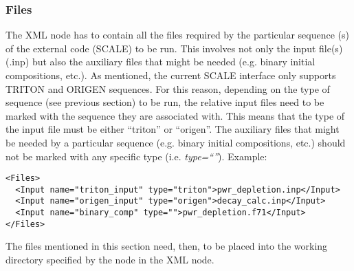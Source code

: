 \subsubsection{Files}
The  XML node has to contain all the files required by the particular
sequence (s) of the external code  (SCALE) to be run.
This involves not only the input file(s) (.inp) but also the auxiliary files that might be needed (e.g. binary initial compositions, etc.).
As mentioned, the current SCALE interface only supports TRITON and ORIGEN sequences. For this reason, depending on the
type of sequence (see previous section) to be run, the relative input files need to be marked with the sequence they are associated
with. This means that the type of the input file must be either ``triton'' or ``origen''. The auxiliary files that might be needed by
a particular sequence (e.g. binary initial compositions, etc.) should not be marked with any specific type (i.e. \textit{type=``''}).
Example:
\begin{lstlisting}[style=XML]
<Files>
  <Input name="triton_input" type="triton">pwr_depletion.inp</Input>
  <Input name="origen_input" type="origen">decay_calc.inp</Input>
  <Input name="binary_comp" type="">pwr_depletion.f71</Input>
</Files>
\end{lstlisting}
The files mentioned in this section
 need, then, to be placed into the working directory specified
by the  node in the  XML node.

